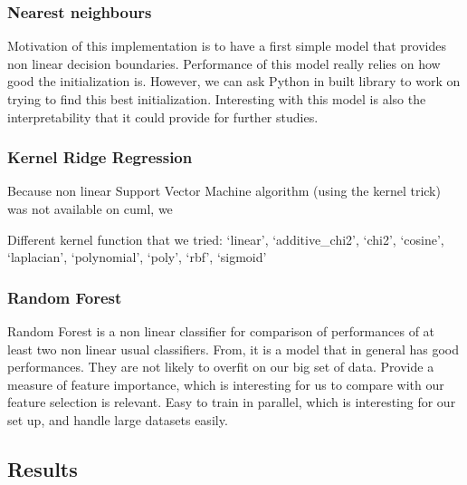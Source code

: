 \documentclass{article}
\begin{document}
    \subsubsection{Nearest neighbours}

    Motivation of this implementation is to have a first simple model that provides non linear decision boundaries.
    Performance of this model really relies on how good the initialization is.
    However, we can ask Python in built library to work on trying to find this best initialization.
    Interesting with this model is also the interpretability that it could provide for further studies.

    \subsubsection{Kernel Ridge Regression}

    Because non linear Support Vector Machine algorithm (using the kernel trick) was not available on cuml, we

    Different kernel function that we tried:
    `linear', `additive\_chi2', `chi2', `cosine', `laplacian', `polynomial', `poly', `rbf', `sigmoid'

    \subsubsection{Random Forest}
    Random Forest is a non linear classifier for comparison of performances of at least two non linear usual classifiers.
    From\cite{MLmodelsComparison}, it is a model that in general has good performances.
    They are not likely to overfit on our big set of data.
    Provide a measure of feature importance, which is interesting for us to compare with our feature selection is relevant.
    Easy to train in parallel, which is interesting for our set up, and handle large datasets easily.

    \subsection{Results}\label{subsec:results}

\end{document}
